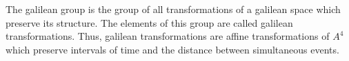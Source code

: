The galilean group is the group of all transformations of a galilean space which preserve its structure. The elements of this group are called galilean transformations. Thus, galilean transformations are affine transformations of $A^4$ which preserve intervals of time and the distance between simultaneous events.
